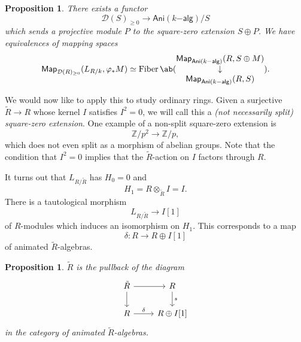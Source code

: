 \documentclass[10pt, oneside]{memoir}
\newtheorem{prop}[thm]{Proposition}
\theoremstyle{definition}
\theoremstyle{remark}
\theoremstyle{plain}
\theoremstyle{definition}
\theoremstyle{remark}
\newcommand{\Z}{\mathbb{Z}}
\newcommand{\mc}[1]{\mathcal{#1}}
\newcommand{\on}[1]{\operatorname{#1}}
\newcommand{\ms}[1]{\mathsf{#1}}
\newcommand{\1}{\mathbf{1}}
\newcommand{\2}{\mathbf{2}}
\newcommand{\3}{\mathbf{3}}
\begin{document}
\begin{prop}
    There exists a functor
    \[ \mc{D}(S)_{\geq 0} \to \ms{Ani}(k\ms{-alg})/S \]
    which sends a projective module \(P \) to the square-zero extension \(S \oplus P \). We have equivalences of mapping spaces
    \[ \ms{Map}_{\mc{D}(R)_{\geq 0}} (L_{R/k}, \varphi_* M) \simeq \on{Fiber} \ab(\begin{matrix}\ms{Map}_{\ms{Ani}(k\ms{-alg})}(R, S \oplus M) \\ \downarrow \\ \ms{Map}_{\ms{Ani}(k\ms{-alg})}(R,S)\end{matrix}). \]
\end{prop}

We would now like to apply this to study ordinary rings. Given a surjective \(\tilde{R} \to R \) whose kernel \(I \) satisfies \(I^2 = 0 \), we will call this a \textit{(not necessarily split) square-zero extension}. One example of a non-split square-zero extension is
\[ \Z/p^2 \to \Z/p, \]
which does not even split as a morphism of abelian groups. Note that the condition that \(I^2 = 0 \) implies that the \(\tilde{R} \)-action on \(I \) factors through \(R \).

It turns out that \(L_{R/\tilde{R}} \) has \(H_0 = 0 \) and 
\[ H_1 = R \otimes_{\tilde{R}} I = I. \]
There is a tautological morphism
\[ L_{R/\tilde{R}} \to I[1] \]
of \(R \)-modules which induces an isomorphism on \(H_1 \). This corresponds to a map
\[ \delta \colon R \to R \oplus I[1] \]
of animated \(\tilde{R} \)-algebras.

\begin{prop}
    \(\tilde{R} \) is the pullback of the diagram
    \begin{equation*}
    \begin{tikzcd}
        \tilde{R} \ar{r} \ar{d} & R \ar{d}{s} \\
        R \ar{r}{\delta} & R \oplus I[1]
    \end{tikzcd}
    \end{equation*}
    in the category of animated \(\tilde{R} \)-algebras.
\end{prop}
\end{document}

